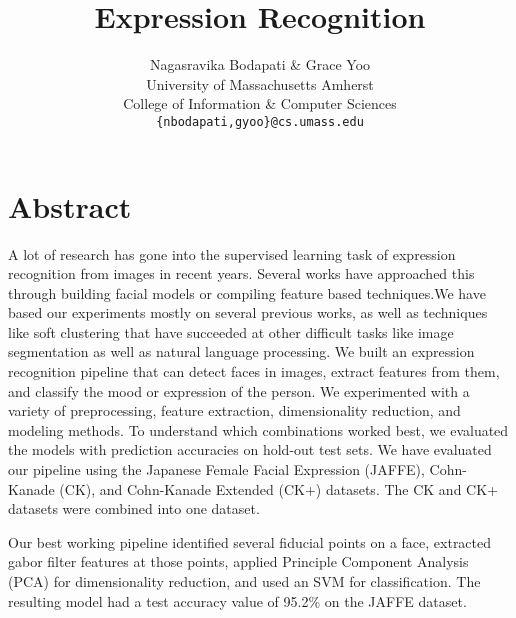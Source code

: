 \documentclass[10pt,twocolumn,letterpaper]{article}
\begin{document}
\title{Expression Recognition}

\author{Nagasravika Bodapati \& Grace Yoo \\ 
University of Massachusetts Amherst \\ 
College of Information \& Computer Sciences \\
{\tt\small \{nbodapati,gyoo\}@cs.umass.edu} \\
}

\maketitle

\section{Abstract} 
A lot of research has gone into the supervised learning task of expression recognition from images in recent years. Several works have approached this through building facial models or compiling feature based techniques.We have based our experiments mostly on several previous works, as well as techniques like soft clustering that have succeeded at other difficult tasks like image segmentation as well as natural language processing.
\noindent We built an expression recognition pipeline that can detect faces in images, extract features from them, and classify the mood or expression of the person. We experimented with a variety of preprocessing, feature extraction, dimensionality reduction, and modeling methods. To understand which combinations worked best, we evaluated the models with prediction accuracies on hold-out test sets. We have evaluated our pipeline using the Japanese Female Facial Expression (JAFFE), Cohn-Kanade (CK), and Cohn-Kanade Extended (CK+) datasets. The CK and CK+ datasets were combined into one dataset. 

\noindent Our best working pipeline identified several fiducial points on a face, extracted gabor filter features at those points, applied Principle Component Analysis (PCA) for dimensionality reduction, and used an SVM for classification. The resulting model had a test accuracy value of 95.2\% on the JAFFE dataset.
\end{document}
